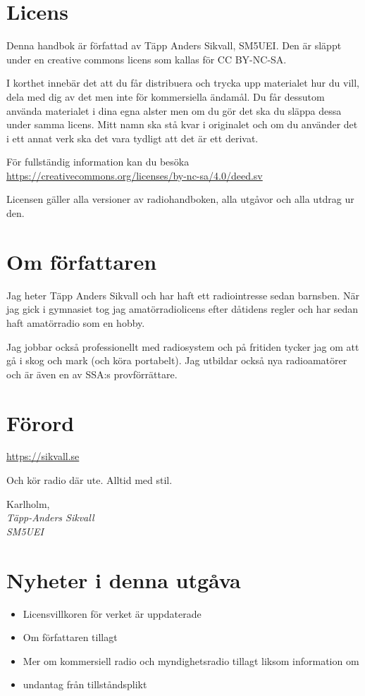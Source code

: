 \section*{Licens}

Denna handbok är författad av Täpp Anders Sikvall, SM5UEI. Den är släppt under
en creative commons licens som kallas för CC BY-NC-SA.

I korthet innebär det att du får distribuera och trycka upp materialet
hur du vill, dela med dig av det men inte för kommersiella ändamål. Du
får dessutom använda materialet i dina egna alster men om du gör det
ska du släppa dessa under samma licens. Mitt namn ska stå kvar i
originalet och om du använder det i ett annat verk ska det vara
tydligt att det är ett derivat.

För fullständig information kan du besöka \\
\url{https://creativecommons.org/licenses/by-nc-sa/4.0/deed.sv}

Licensen gäller alla versioner av radiohandboken, alla utgåvor och
alla utdrag ur den.

\section*{Om författaren}

Jag heter Täpp Anders Sikvall och har haft ett radiointresse sedan barnsben. När
jag gick i gymnasiet tog jag amatörradiolicens efter dåtidens regler och har
sedan haft amatörradio som en hobby.

Jag jobbar också professionellt med radiosystem och på fritiden tycker jag om
att gå i skog och mark (och köra portabelt). Jag utbildar också nya
radioamatörer och är även en av SSA:s provförrättare.

\section*{Förord}


\url{https://sikvall.se}

Och kör radio där ute. Alltid med stil.

\vspace{4mm}

Karlholm, \DokumentDatum\\
\textit{Täpp-Anders Sikvall\\
	SM5UEI}

\clearpage

\section*{Nyheter i denna utgåva}

\begin{itemize}
  \item Licensvillkoren för verket är uppdaterade
  \item Om författaren tillagt
  \item Mer om kommersiell radio och myndighetsradio tillagt liksom information om
  \item undantag från tillståndsplikt
\end{itemize}

\clearpage


